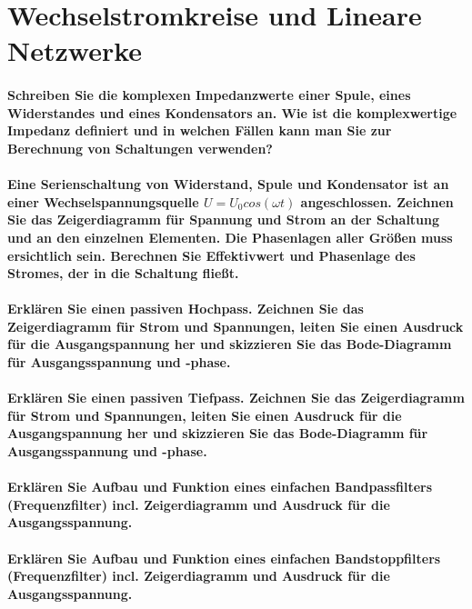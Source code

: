 \documentclass[a4paper, 11pt, parskip=half]{scrartcl}
\begin{document}
\newpage

\section{Wechselstromkreise und Lineare Netzwerke}

\paragraph{Schreiben Sie die komplexen Impedanzwerte einer Spule, eines Widerstandes und eines
Kondensators an. Wie ist die komplexwertige Impedanz definiert und in welchen Fällen kann man Sie
zur Berechnung von Schaltungen verwenden?}

\paragraph{Eine Serienschaltung von Widerstand, Spule und Kondensator ist an einer
Wechselspannungsquelle $U=U_0 cos (\omega t)$ angeschlossen. Zeichnen Sie das Zeigerdiagramm für
Spannung und Strom an der Schaltung und an den einzelnen Elementen. Die Phasenlagen aller Größen
muss ersichtlich sein. Berechnen Sie Effektivwert und Phasenlage des Stromes, der in die Schaltung
fließt.}

\paragraph{Erklären Sie einen passiven Hochpass. Zeichnen Sie das Zeigerdiagramm für Strom und
Spannungen, leiten Sie einen Ausdruck für die Ausgangspannung her und skizzieren Sie das
Bode-Diagramm für Ausgangsspannung und -phase.}

\paragraph{Erklären Sie einen passiven Tiefpass. Zeichnen Sie das Zeigerdiagramm für Strom und
Spannungen, leiten Sie einen Ausdruck für die Ausgangspannung her und skizzieren Sie das
Bode-Diagramm für Ausgangsspannung und -phase.}

\paragraph{Erklären Sie Aufbau und Funktion eines einfachen Bandpassfilters (Frequenzfilter) incl.
Zeigerdiagramm und Ausdruck für die Ausgangsspannung.}

\paragraph{Erklären Sie Aufbau und Funktion eines einfachen Bandstoppfilters (Frequenzfilter) incl.
Zeigerdiagramm und Ausdruck für die Ausgangsspannung.}
\end{document}
